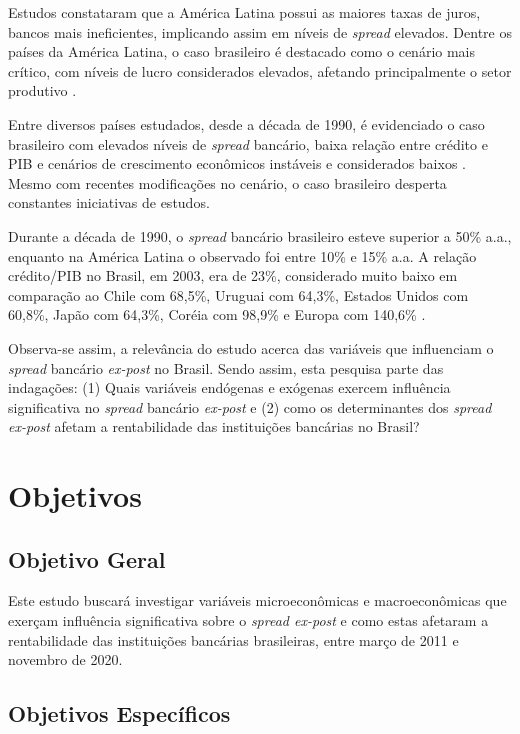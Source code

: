 \documentclass[
  12pt,
  12pt,
  openright,
  oneside,
  a4paper,
  chapter=TITLE,
  section=TITLE,
  subsection=TITLE,
  subsubsection=TITLE,
  english,
  portugues,
  sumario=tradicional]{abntex2}
\begin{document}
Estudos constataram que a América Latina possui as maiores taxas de juros, bancos mais ineficientes, implicando assim em níveis de \emph{spread} elevados. Dentre os países da América Latina, o caso brasileiro é destacado como o cenário mais crítico, com níveis de lucro considerados elevados, afetando principalmente o setor produtivo \cite{dantas:2012}.

Entre diversos países estudados, desde a década de 1990, é evidenciado o caso brasileiro com elevados níveis de \emph{spread} bancário, baixa relação entre crédito e PIB e cenários de crescimento econômicos instáveis e considerados baixos \cite{levine:1997, matos:2003}. Mesmo com recentes modificações no cenário, o caso brasileiro desperta constantes iniciativas de estudos.

Durante a década de 1990, o \emph{spread} bancário brasileiro esteve superior a 50\% a.a., enquanto na América Latina o observado foi entre 10\% e 15\% a.a. A relação crédito/PIB no Brasil, em 2003, era de 23\%, considerado muito baixo em comparação ao Chile com 68,5\%, Uruguai com 64,3\%, Estados Unidos com 60,8\%, Japão com 64,3\%, Coréia com 98,9\% e Europa com 140,6\% \cite{camargo:2009, singh:2005}.

Observa-se assim, a relevância do estudo acerca das variáveis que influenciam o \emph{spread} bancário \emph{ex-post} no Brasil. Sendo assim, esta pesquisa parte das indagações: (1) Quais variáveis endógenas e exógenas exercem influência significativa no \emph{spread} bancário \emph{ex-post} e (2) como os determinantes dos \emph{spread ex-post} afetam a rentabilidade das instituições bancárias no Brasil?

\section{Objetivos}

\subsection{Objetivo Geral}

Este estudo buscará investigar variáveis microeconômicas e macroeconômicas que exerçam influência significativa sobre o \emph{spread ex-post} e como estas afetaram a rentabilidade das instituições bancárias brasileiras, entre março de 2011 e novembro de 2020.

\subsection{Objetivos Específicos}
\end{document}
